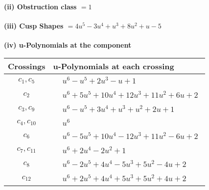 \documentclass[1p]{elsarticle_modified}
\theoremstyle{definition}
\begin{document}
\flushleft \textbf{(ii) Obstruction class $= 1$}\\~\\
\flushleft \textbf{(iii) Cusp Shapes $= 4 u^5-3 u^4+u^3+8 u^2+u-5$}\\~\\
\newpage\renewcommand{\arraystretch}{1}
\flushleft \textbf{(iv) u-Polynomials at the component}\newline \\
\begin{tabular}{m{50pt}|m{274pt}}
Crossings & \hspace{64pt}u-Polynomials at each crossing \\
\hline $$\begin{aligned}c_{1},c_{5}\end{aligned}$$&$\begin{aligned}
&u^6- u^5+2 u^3- u+1
\end{aligned}$\\
\hline $$\begin{aligned}c_{2}\end{aligned}$$&$\begin{aligned}
&u^6+5 u^5+10 u^4+12 u^3+11 u^2+6 u+2
\end{aligned}$\\
\hline $$\begin{aligned}c_{3},c_{9}\end{aligned}$$&$\begin{aligned}
&u^6- u^5+3 u^4+u^3+u^2+2 u+1
\end{aligned}$\\
\hline $$\begin{aligned}c_{4},c_{10}\end{aligned}$$&$\begin{aligned}
&u^6
\end{aligned}$\\
\hline $$\begin{aligned}c_{6}\end{aligned}$$&$\begin{aligned}
&u^6-5 u^5+10 u^4-12 u^3+11 u^2-6 u+2
\end{aligned}$\\
\hline $$\begin{aligned}c_{7},c_{11}\end{aligned}$$&$\begin{aligned}
&u^6+2 u^4-2 u^2+1
\end{aligned}$\\
\hline $$\begin{aligned}c_{8}\end{aligned}$$&$\begin{aligned}
&u^6-2 u^5+4 u^4-5 u^3+5 u^2-4 u+2
\end{aligned}$\\
\hline $$\begin{aligned}c_{12}\end{aligned}$$&$\begin{aligned}
&u^6+2 u^5+4 u^4+5 u^3+5 u^2+4 u+2
\end{aligned}$\\
\hline
\end{tabular}\\~\\
\end{document}
